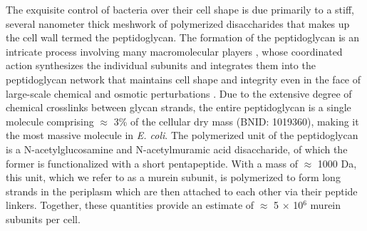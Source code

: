 The exquisite control of bacteria over their cell shape is due primarily to a stiff, several nanometer thick meshwork of
polymerized disaccharides that makes up the cell wall termed the peptidoglycan. The formation of the peptidoglycan is an intricate
process involving many macromolecular players \citep{shi2018, morgenstein2015},
whose coordinated action synthesizes the individual subunits and integrates them
into the peptidoglycan network that maintains cell shape and integrity even in the face of
large-scale chemical and osmotic perturbations \citep{harris2018,shi2018}.
Due to the extensive degree of chemical crosslinks between glycan strands, the
entire peptidoglycan is a single molecule comprising $\approx$ 3\% of the cellular dry mass (BNID:
1019360), making it the most massive molecule in \textit{E. coli}. The
polymerized unit of the peptidoglycan is a N-acetylglucosamine and
N-acetylmuramic acid disaccharide, of which the former is functionalized with a
short pentapeptide. With a mass of $\approx$ 1000 Da, this unit, which we refer
to as a murein subunit, is polymerized to form long strands in the periplasm
which are then attached to each other via their peptide linkers. Together, these
quantities provide an estimate of $\approx$ 5 $\times$ 10$^6$ murein subunits
per cell.

